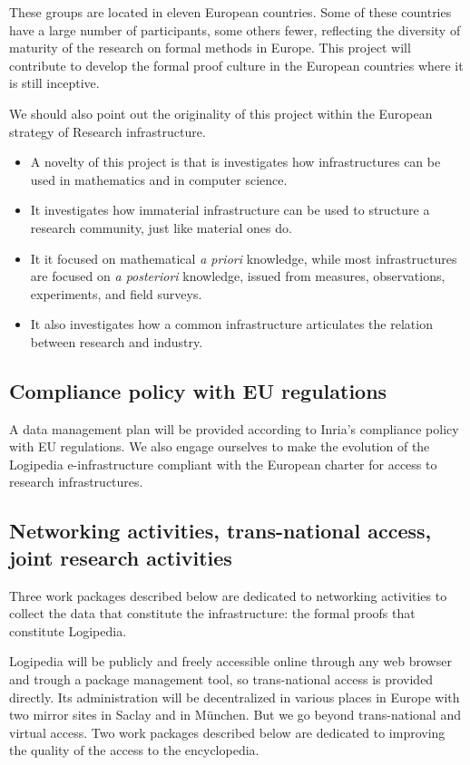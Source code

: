 These groups are located in eleven European countries.  Some of these
countries have a large number of participants, some others fewer,
reflecting the diversity of maturity of the research on formal methods
in Europe. This project will contribute to develop the formal proof
culture in the European countries where it is still inceptive.

We should also point out the originality of this project within the
European strategy of Research infrastructure. 
\begin{itemize}
\item A novelty of this
project is that is investigates how infrastructures can be used in
mathematics and in computer science. 
\item It investigates how immaterial
infrastructure can be used to structure a research community, just
like material ones do. 
\item It it focused on mathematical {\em a priori} knowledge, while
  most infrastructures are focused on {\em a posteriori} knowledge,
  issued from measures, observations, experiments, and field surveys. 
\item It also investigates how a common infrastructure articulates the
  relation between research and industry.
\end{itemize}


\subsection{Compliance policy with EU regulations}

A data management plan will be provided according to Inria’s
compliance policy with EU regulations. We also engage ourselves to
make the evolution of the {\sf Logipedia} e-infrastructure compliant
with the European charter for access to research infrastructures.

\subsection{Networking activities, trans-national access, joint
  research activities}

Three work packages described below are dedicated to networking activities
to collect the data that constitute the infrastructure: the formal proofs
that constitute {\sf Logipedia}.

{\sf Logipedia} will be publicly and freely accessible online through
any web browser and trough a package management tool, so
trans-national access is provided directly. Its administration will be
decentralized in various places in Europe with two mirror sites in
Saclay and in München. But we go beyond trans-national and virtual
access.  Two work packages described below are dedicated to improving
the quality of the access to the encyclopedia.

